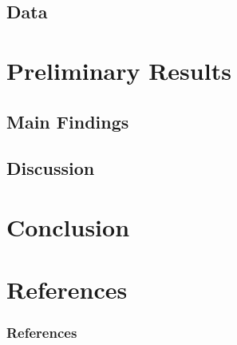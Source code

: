 \documentclass[11pt, aspectratio=1610, xcolor={dvipsnames}]{beamer}
\begin{document}
	\subsection{Data}
	\begin{frame}
		\frametitle{}
	\end{frame}
	
	\section{Preliminary Results}
	\begin{frame}
		\frametitle{}
	\end{frame}
	
	\subsection{Main Findings}
	\begin{frame}
		\frametitle{}
	\end{frame}
	
	\subsection{Discussion}
	\begin{frame}
		\frametitle{}
	\end{frame}
	
	\section{Conclusion}
	\begin{frame}
		\frametitle{}
	\end{frame}
	
	\section*{References}
	\begin{frame}
		\frametitle{References}
	\end{frame}
	
\end{document}
